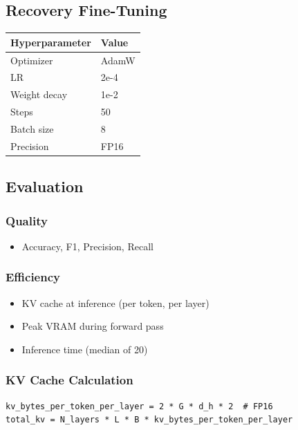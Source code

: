\subsection{Recovery Fine-Tuning}

\begin{table}[H]
\centering
\small
\begin{tabular}{ll}
\toprule
\textbf{Hyperparameter} & \textbf{Value} \\
\midrule
Optimizer & AdamW \\
LR & 2e-4 \\
Weight decay & 1e-2 \\
Steps & 50 \\
Batch size & 8 \\
Precision & FP16 \\
\bottomrule
\end{tabular}
\end{table}

\subsection{Evaluation}

\subsubsection{Quality}
\begin{itemize}
\item Accuracy, F1, Precision, Recall

\end{itemize}
\subsubsection{Efficiency}
\begin{itemize}
\item KV cache at inference (per token, per layer)
\item Peak VRAM during forward pass
\item Inference time (median of 20)

\end{itemize}
\subsubsection{KV Cache Calculation}

\begin{lstlisting}
kv_bytes_per_token_per_layer = 2 * G * d_h * 2  # FP16
total_kv = N_layers * L * B * kv_bytes_per_token_per_layer
\end{lstlisting}

